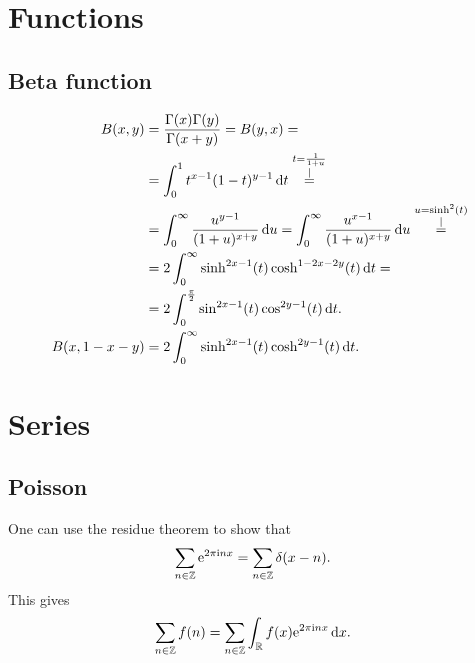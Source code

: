\documentclass[english, parskip=full]{scrartcl}
\title{\titel}
\author{\autor}
\date{\today}
\begin{document}
\maketitle  %

\section{Functions}
\subsection{Beta function}
\begin{align}
B(x,y) &= \frac{\Gamma(x)\Gamma(y)}{\Gamma(x+y)} = B(y,x) = \\
&= \int_{0}^{1} t^{x-1}(1-t)^{y-1} \,\mathrm{d}t \overset{\substack{t = \frac{1}{1+u} \\ |}}{=} \\
&= \int_{0}^{\infty} \frac{u^{y-1}}{(1+u)^{x+y}} \,\mathrm{d}u = \int_{0}^{\infty} \frac{u^{x-1}}{(1+u)^{x+y}} \,\mathrm{d}u \overset{\substack{u = \sinh^2(t) \\ |}}{=} \\
&= 2\int_{0}^{\infty} \sinh^{2x-1}(t) \cosh^{1-2x-2y}(t) \,\mathrm{d}t = \\
&= 2\int_{0}^{\frac{\pi}{2}} \sin^{2x-1}(t) \cos^{2y-1}(t) \,\mathrm{d}t.\\
B(x,1-x-y) &= 2\int_{0}^{\infty} \sinh^{2x-1}(t)\cosh^{2y-1}(t) \,\mathrm{d}t.
\end{align}
\section{Series}
\subsection{Poisson}
One can use the residue theorem to show that
\begin{align}
\sum_{n\in\mathbb{Z}} \text{e}^{2\pi\text{i} nx} &= \sum_{n\in\mathbb{Z}} \delta(x-n).
\end{align}
This gives
\begin{align}
\sum_{n\in\mathbb{Z}} f(n) &= \sum_{n\in\mathbb{Z}} \int_{\mathbb{R}} f(x) \text{e}^{2\pi\text{i} nx} \, \mathrm{d}x.
\end{align}
\end{document}
